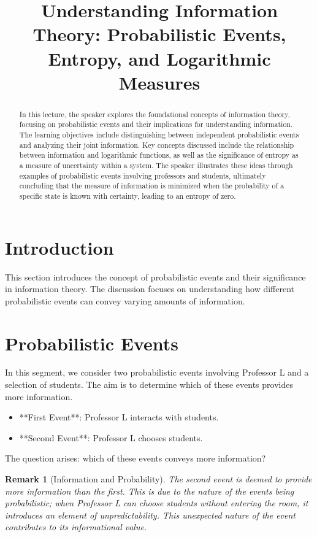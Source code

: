 \documentclass[12pt,a4paper]{article}
\title{Understanding Information Theory: Probabilistic Events, Entropy, and Logarithmic Measures}
\newtheorem{remark}{Remark}[section]
\begin{document}
\maketitle
\begin{abstract}
In this lecture, the speaker explores the foundational concepts of information theory, focusing on probabilistic events and their implications for understanding information. The learning objectives include distinguishing between independent probabilistic events and analyzing their joint information. Key concepts discussed include the relationship between information and logarithmic functions, as well as the significance of entropy as a measure of uncertainty within a system. The speaker illustrates these ideas through examples of probabilistic events involving professors and students, ultimately concluding that the measure of information is minimized when the probability of a specific state is known with certainty, leading to an entropy of zero.
\end{abstract}

\section{Introduction}
This section introduces the concept of probabilistic events and their significance in information theory. The discussion focuses on understanding how different probabilistic events can convey varying amounts of information.

\section{Probabilistic Events}
In this segment, we consider two probabilistic events involving Professor L and a selection of students. The aim is to determine which of these events provides more information.

\begin{itemize}
    \item **First Event**: Professor L interacts with students.
    \item **Second Event**: Professor L chooses students.
\end{itemize}

The question arises: which of these events conveys more information? 

\begin{remark}[Information and Probability]
The second event is deemed to provide more information than the first. This is due to the nature of the events being probabilistic; when Professor L can choose students without entering the room, it introduces an element of unpredictability. This unexpected nature of the event contributes to its informational value.
\end{remark}
\end{document}
